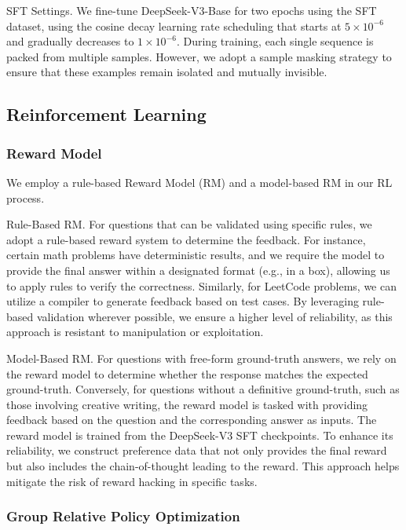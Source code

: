 \documentclass[11pt,a4paper]{article}
\begin{document}
SFT Settings. We fine-tune DeepSeek-V3-Base for two epochs using the SFT dataset, using the cosine decay learning rate scheduling that starts at $5 \times 10^{-6}$ and gradually decreases to $1 \times 10^{-6}$. During training, each single sequence is packed from multiple samples. However, we adopt a sample masking strategy to ensure that these examples remain isolated and mutually invisible.

\subsection{Reinforcement Learning}

\subsubsection{Reward Model}

We employ a rule-based Reward Model (RM) and a model-based RM in our RL process.

Rule-Based RM. For questions that can be validated using specific rules, we adopt a rule-based reward system to determine the feedback. For instance, certain math problems have deterministic results, and we require the model to provide the final answer within a designated format (e.g., in a box), allowing us to apply rules to verify the correctness. Similarly, for LeetCode problems, we can utilize a compiler to generate feedback based on test cases. By leveraging rule-based validation wherever possible, we ensure a higher level of reliability, as this approach is resistant to manipulation or exploitation.

Model-Based RM. For questions with free-form ground-truth answers, we rely on the reward model to determine whether the response matches the expected ground-truth. Conversely, for questions without a definitive ground-truth, such as those involving creative writing, the reward model is tasked with providing feedback based on the question and the corresponding answer as inputs. The reward model is trained from the DeepSeek-V3 SFT checkpoints. To enhance its reliability, we construct preference data that not only provides the final reward but also includes the chain-of-thought leading to the reward. This approach helps mitigate the risk of reward hacking in specific tasks.

\subsubsection{Group Relative Policy Optimization}
\end{document}
